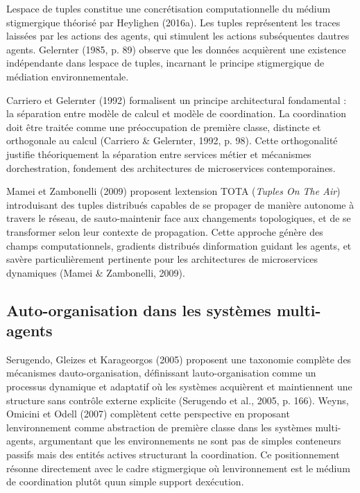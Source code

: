 \documentclass[12pt,a4paper]{article}
\begin{document}
L\textquotesingle espace de tuples constitue une concrétisation
computationnelle du médium stigmergique théorisé par Heylighen (2016a).
Les tuples représentent les traces laissées par les actions des agents,
qui stimulent les actions subséquentes d\textquotesingle autres agents.
Gelernter (1985, p. 89) observe que les données acquièrent une existence
indépendante dans l\textquotesingle espace de tuples, incarnant le
principe stigmergique de médiation environnementale.

Carriero et Gelernter (1992) formalisent un principe architectural
fondamental : la séparation entre modèle de calcul et modèle de
coordination. La coordination doit être traitée comme une préoccupation
de première classe, distincte et orthogonale au calcul (Carriero \&
Gelernter, 1992, p. 98). Cette orthogonalité justifie théoriquement la
séparation entre services métier et mécanismes
d\textquotesingle orchestration, fondement des architectures de
microservices contemporaines.

Mamei et Zambonelli (2009) proposent l\textquotesingle extension TOTA
(\emph{Tuples On The Air}) introduisant des tuples distribués capables
de se propager de manière autonome à travers le réseau, de
s\textquotesingle auto-maintenir face aux changements topologiques, et
de se transformer selon leur contexte de propagation. Cette approche
génère des champs computationnels, gradients distribués
d\textquotesingle information guidant les agents, et
s\textquotesingle avère particulièrement pertinente pour les
architectures de microservices dynamiques (Mamei \& Zambonelli, 2009).

\subsection{Auto-organisation dans les systèmes
multi-agents}\label{auto-organisation-dans-les-systuxe8mes-multi-agents}

Serugendo, Gleizes et Karageorgos (2005) proposent une taxonomie
complète des mécanismes d\textquotesingle auto-organisation, définissant
l\textquotesingle auto-organisation comme un processus dynamique et
adaptatif où les systèmes acquièrent et maintiennent une structure sans
contrôle externe explicite (Serugendo et al., 2005, p. 166). Weyns,
Omicini et Odell (2007) complètent cette perspective en proposant
l\textquotesingle environnement comme abstraction de première classe
dans les systèmes multi-agents, argumentant que les environnements ne
sont pas de simples conteneurs passifs mais des entités actives
structurant la coordination. Ce positionnement résonne directement avec
le cadre stigmergique où l\textquotesingle environnement est le médium
de coordination plutôt qu\textquotesingle un simple support
d\textquotesingle exécution.
\end{document}
